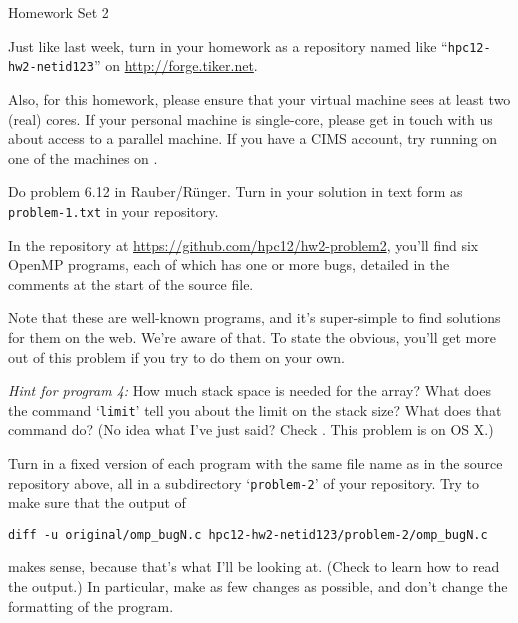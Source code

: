\documentclass[11pt]{article}
\begin{document}
%
{Homework Set 2}

Just like last week, turn in your homework as a repository named like
``\texttt{hpc12-hw2-netid123}'' on \url{http://forge.tiker.net}.

Also, for this homework, please ensure that your virtual machine sees
at least two (real) cores. If your personal machine is single-core,
please get in touch with us about access to a parallel machine. If you
have a CIMS account, try running on one of the machines on
.

\bigskip
{}

Do problem 6.12 in Rauber/Rünger. Turn in your solution in text
form as \texttt{problem-1.txt} in your repository.

\bigskip


In the repository at \url{https://github.com/hpc12/hw2-problem2},
you'll find six OpenMP programs, each of which has one or more bugs,
detailed in the comments at the start of the source file.

Note that these are well-known programs, and it's super-simple to find
solutions for them on the web. We're aware of that. To state the
obvious, you'll get more out of this problem if you try to do them on
your own.

\emph{Hint for program 4:} How much stack space is needed for the
array? What does the command `\texttt{limit}' tell you about the
limit on the stack size? What does that command do? (No idea what I've just said?
Check .
This problem is
 on OS X.)

Turn in a fixed version of each program with the same file name as in
the source repository above, all in a subdirectory `\texttt{problem-2}'
of your repository. Try to make sure that the output of
\begin{lstlisting}
diff -u original/omp_bugN.c hpc12-hw2-netid123/problem-2/omp_bugN.c
\end{lstlisting}
makes sense, because that's what I'll be looking at.
(Check  to
learn how to read the output.)
In particular, make as few changes as possible, and don't change
the formatting of the program.
\end{document}
